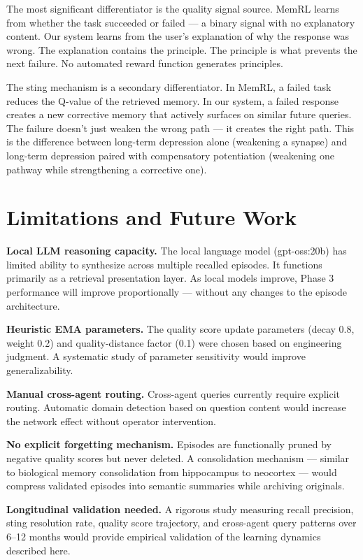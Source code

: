 \documentclass[11pt,a4paper]{article}
\begin{document}
The most significant differentiator is the quality signal source. MemRL learns from whether the task succeeded or failed --- a binary signal with no explanatory content. Our system learns from the user's explanation of why the response was wrong. The explanation contains the principle. The principle is what prevents the next failure. No automated reward function generates principles.

The sting mechanism is a secondary differentiator. In MemRL, a failed task reduces the Q-value of the retrieved memory. In our system, a failed response creates a new corrective memory that actively surfaces on similar future queries. The failure doesn't just weaken the wrong path --- it creates the right path. This is the difference between long-term depression alone (weakening a synapse) and long-term depression paired with compensatory potentiation (weakening one pathway while strengthening a corrective one).

\section{Limitations and Future Work}

\textbf{Local LLM reasoning capacity.} The local language model (gpt-oss:20b) has limited ability to synthesize across multiple recalled episodes. It functions primarily as a retrieval presentation layer. As local models improve, Phase 3 performance will improve proportionally --- without any changes to the episode architecture.

\textbf{Heuristic EMA parameters.} The quality score update parameters (decay 0.8, weight 0.2) and quality-distance factor (0.1) were chosen based on engineering judgment. A systematic study of parameter sensitivity would improve generalizability.

\textbf{Manual cross-agent routing.} Cross-agent queries currently require explicit routing. Automatic domain detection based on question content would increase the network effect without operator intervention.

\textbf{No explicit forgetting mechanism.} Episodes are functionally pruned by negative quality scores but never deleted. A consolidation mechanism --- similar to biological memory consolidation from hippocampus to neocortex --- would compress validated episodes into semantic summaries while archiving originals.

\textbf{Longitudinal validation needed.} A rigorous study measuring recall precision, sting resolution rate, quality score trajectory, and cross-agent query patterns over 6--12 months would provide empirical validation of the learning dynamics described here.
\end{document}
